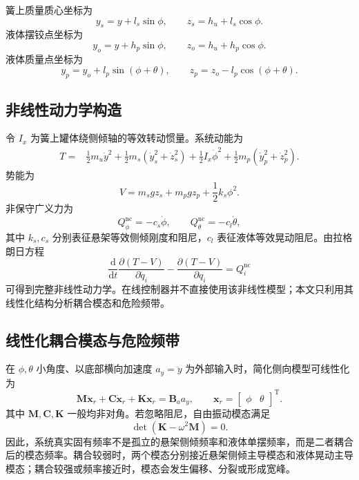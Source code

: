 \documentclass[UTF8,zihao=-4]{ctexrep}
\newcommand{\ay}{a_y}
\newcommand{\T}{\mathrm{T}}
\newcommand{\dd}{\mathrm{d}}
\begin{document}
簧上质量质心坐标为
\begin{equation}
    y_s = y+l_s\sin\phi,\qquad z_s=h_u+l_s\cos\phi .
\end{equation}
液体摆铰点坐标为
\begin{equation}
    y_o = y+h_p\sin\phi,\qquad z_o=h_u+h_p\cos\phi .
\end{equation}
液体质量点坐标为
\begin{equation}
    y_p=y_o+l_p\sin(\phi+\theta),\qquad
    z_p=z_o-l_p\cos(\phi+\theta).
\end{equation}

\subsection{非线性动力学构造}
令 $I_x$ 为簧上罐体绕侧倾轴的等效转动惯量。系统动能为
\begin{equation}
\begin{aligned}
T={}&\frac{1}{2}m_u\dot y^2+\frac{1}{2}m_s(\dot y_s^2+\dot z_s^2)+\frac{1}{2}I_x\dot\phi^2
    +\frac{1}{2}m_p(\dot y_p^2+\dot z_p^2).
\end{aligned}
\end{equation}
势能为
\begin{equation}
    V=m_sgz_s+m_pgz_p+\frac{1}{2}k_s\phi^2.
\end{equation}
非保守广义力为
\begin{equation}
    Q_{\phi}^{\mathrm{nc}}=-c_s\dot\phi,\qquad Q_{\theta}^{\mathrm{nc}}=-c_l\dot\theta,
\end{equation}
其中 $k_s,c_s$ 分别表征悬架等效侧倾刚度和阻尼，$c_l$ 表征液体等效晃动阻尼。由拉格朗日方程
\begin{equation}
    \frac{\dd}{\dd t}\frac{\partial (T-V)}{\partial \dot q_i}-\frac{\partial (T-V)}{\partial q_i}=Q_i^{\mathrm{nc}}
\end{equation}
可得到完整非线性动力学。在线控制器并不直接使用该非线性模型；本文只利用其线性化结构分析耦合模态和危险频带。

\subsection{线性化耦合模态与危险频带}
在 $\phi,\theta$ 小角度、以底部横向加速度 $\ay=\ddot y$ 为外部输入时，简化侧向模型可线性化为
\begin{equation}
    \bm M\ddot{\bm x}_r+\bm C\dot{\bm x}_r+\bm K\bm x_r=\bm B_a \ay,
    \qquad
    \bm x_r=\begin{bmatrix}\phi&\theta\end{bmatrix}^{\T}.
    \label{eq:modelB_linear}
\end{equation}
其中 $\bm M,\bm C,\bm K$ 一般均非对角。若忽略阻尼，自由振动模态满足
\begin{equation}
    \det(\bm K-\omega^2\bm M)=0.
    \label{eq:coupled_modal}
\end{equation}
因此，系统真实固有频率不是孤立的悬架侧倾频率和液体单摆频率，而是二者耦合后的模态频率。耦合较弱时，两个模态分别接近悬架侧倾主导模态和液体晃动主导模态；耦合较强或频率接近时，模态会发生偏移、分裂或形成宽峰。
\end{document}
